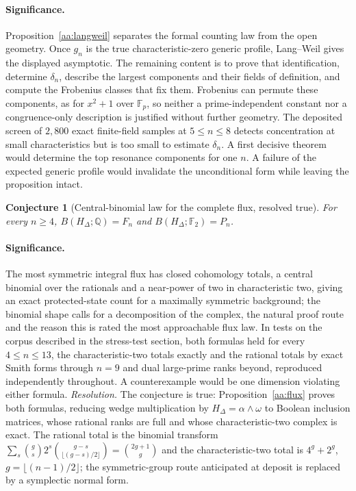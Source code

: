 \documentclass[11pt]{article}
\newtheorem{conjecture}{Conjecture}
\theoremstyle{definition}
\begin{document}
\paragraph{Significance.}
Proposition~\ref{aa:langweil} separates the formal counting law from the open geometry.  Once $g_n$ is the true characteristic-zero generic profile, Lang--Weil gives the displayed asymptotic.  The remaining content is to prove that identification, determine $\delta_n$, describe the largest components and their fields of definition, and compute the Frobenius classes that fix them.  Frobenius can permute these components, as for $x^2+1$ over $\mathbb F_p$, so neither a prime-independent constant nor a congruence-only description is justified without further geometry.  The deposited screen of $2{,}800$ exact finite-field samples at $5\le n\le8$ detects concentration at small characteristics but is too small to estimate $\delta_n$.  A first decisive theorem would determine the top resonance components for one $n$.  A failure of the expected generic profile would invalidate the unconditional form while leaving the proposition intact.

\begin{conjecture}[Central-binomial law for the complete flux, resolved true]\label{aa6}
For every $n\ge4$, $B(H_\Delta;\mathbb Q)=F_n$ and $B(H_\Delta;\mathbb F_2)=P_n$.
\end{conjecture}

\paragraph{Significance.}
The most symmetric integral flux has closed cohomology totals, a central binomial over the rationals and a near-power of two in characteristic two, giving an exact protected-state count for a maximally symmetric background; the binomial shape calls for a decomposition of the complex, the natural proof route and the reason this is rated the most approachable flux law.  In tests on the corpus described in the stress-test section, both formulas held for every $4\le n\le13$, the characteristic-two totals exactly and the rational totals by exact Smith forms through $n=9$ and dual large-prime ranks beyond, reproduced independently throughout.  A counterexample would be one dimension violating either formula.  \emph{Resolution.} The conjecture is true: Proposition~\ref{aa:flux} proves both formulas, reducing wedge multiplication by $H_\Delta=\alpha\wedge\omega$ to Boolean inclusion matrices, whose rational ranks are full and whose characteristic-two complex is exact.  The rational total is the binomial transform $\sum_s\binom gs2^{s}\binom{g-s}{\lfloor(g-s)/2\rfloor}=\binom{2g+1}g$ and the characteristic-two total is $4^{g}+2^{g}$, $g=\lfloor(n-1)/2\rfloor$; the symmetric-group route anticipated at deposit is replaced by a symplectic normal form.
\end{document}
